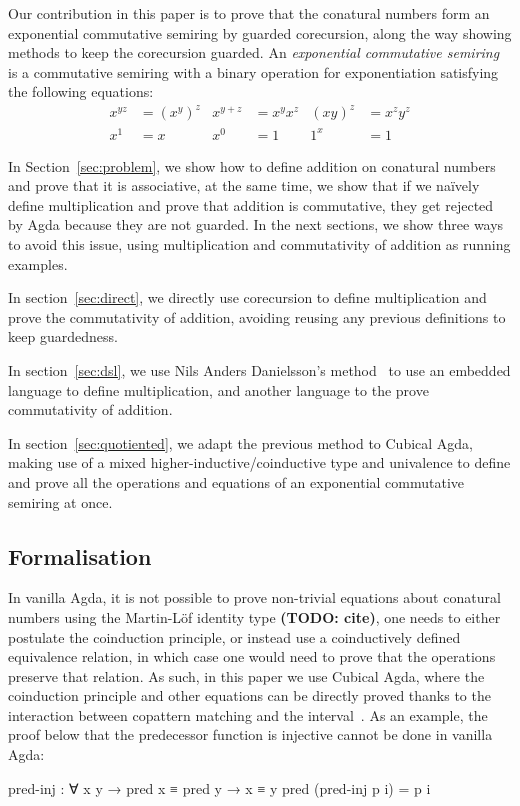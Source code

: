 Our contribution in this paper is to prove that the conatural numbers form an
exponential commutative semiring by guarded corecursion, along the way showing
methods to keep the corecursion guarded. An \emph{exponential commutative
semiring} is a commutative semiring with a binary operation for exponentiation
satisfying the following equations:
\begin{align*}
  x^{yz} &= (x^y)^z & x^{y+z} &= x^y x^z & (xy)^z &= x^z y^z \\
  x^1 &= x & x^0 &= 1 & 1^x &= 1
\end{align*}

In Section~\ref{sec:problem}, we show how to define addition on conatural
numbers and prove that it is associative, at the same time, we show that if we
naïvely define multiplication and prove that addition is commutative, they get
rejected by Agda because they are not guarded. In the next sections, we show
three ways to avoid this issue, using multiplication and commutativity of
addition as running examples.

In section~\ref{sec:direct}, we directly use corecursion to define
multiplication and prove the commutativity of addition, avoiding reusing any
previous definitions to keep guardedness.

In section~\ref{sec:dsl}, we use Nils Anders Danielsson's
method~\cite{danielsson-beating} to use an embedded language to define
multiplication, and another language to the prove commutativity of addition.

In section~\ref{sec:quotiented}, we adapt the previous method to Cubical Agda,
making use of a mixed higher-inductive/coinductive type and univalence to
define and prove all the operations and equations of an exponential commutative
semiring at once.

\subsection{Formalisation}

In vanilla Agda, it is not possible to prove non-trivial equations about
conatural numbers using the Martin-Löf identity type \textbf{(TODO: cite)}, one
needs to either postulate the coinduction principle, or instead use a
coinductively defined equivalence relation, in which case one would need to
prove that the operations preserve that relation. As such, in this paper we use
Cubical Agda, where the coinduction principle and other equations can be
directly proved thanks to the interaction between copattern matching and the
interval~\cite{vezzosi-cubical}. As an example, the proof below that the
predecessor function is injective cannot be done in vanilla Agda:
\begin{code}
pred-inj : ∀ {x y} → pred x ≡ pred y → x ≡ y
pred (pred-inj p i) = p i
\end{code}

